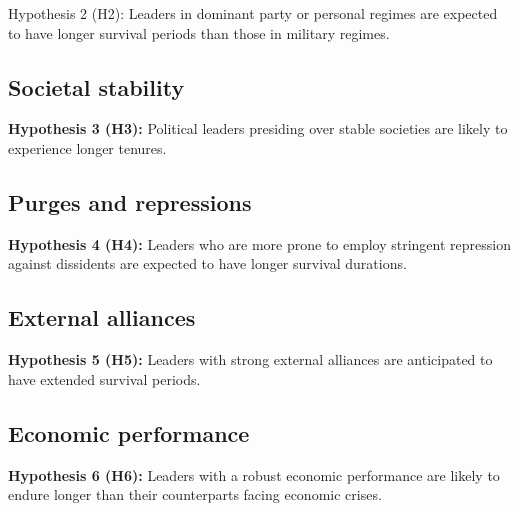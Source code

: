 \documentclass[
  12pt,
  a4paper,
  12pt]{article}
\begin{document}
Hypothesis 2 (H2): Leaders in dominant party or personal regimes are
expected to have longer survival periods than those in military regimes.

\hypertarget{societal-stability}{%
\subsection{Societal stability}\label{societal-stability}}

\textbf{Hypothesis 3 (H3):} Political leaders presiding over stable
societies are likely to experience longer tenures.

\hypertarget{purges-and-repressions}{%
\subsection{Purges and repressions}\label{purges-and-repressions}}

\textbf{Hypothesis 4 (H4):} Leaders who are more prone to employ
stringent repression against dissidents are expected to have longer
survival durations.

\hypertarget{external-alliances}{%
\subsection{External alliances}\label{external-alliances}}

\textbf{Hypothesis 5 (H5):} Leaders with strong external alliances are
anticipated to have extended survival periods.

\hypertarget{economic-performance}{%
\subsection{Economic performance}\label{economic-performance}}

\textbf{Hypothesis 6 (H6):} Leaders with a robust economic performance
are likely to endure longer than their counterparts facing economic
crises.

\newpage


\renewcommand\refname{References}
  
\end{document}
